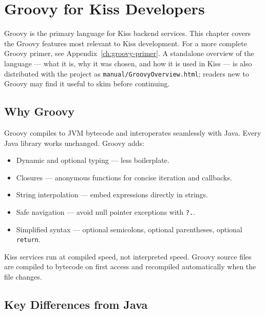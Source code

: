 \chapter{Groovy for Kiss Developers}
\label{ch:groovy}

Groovy is the primary language for Kiss backend services.  This chapter covers the Groovy features most relevant to Kiss development.  For a more complete Groovy primer, see Appendix~\ref{ch:groovy-primer}.  A standalone overview of the language --- what it is, why it was chosen, and how it is used in Kiss --- is also distributed with the project as \texttt{manual/\allowbreak{}GroovyOverview.html}; readers new to Groovy may find it useful to skim before continuing.

\section{Why Groovy}
\label{sec:groovy-why}

Groovy compiles to JVM bytecode and interoperates seamlessly with Java.  Every Java library works unchanged.  Groovy adds:

\begin{itemize}
  \item Dynamic and optional typing --- less boilerplate.
  \item Closures --- anonymous functions for concise iteration and callbacks.
  \item String interpolation --- embed expressions directly in strings.
  \item Safe navigation --- avoid null pointer exceptions with \texttt{?.}.
  \item Simplified syntax --- optional semicolons, optional parentheses, optional \texttt{return}.
\end{itemize}

\noindent
Kiss services run at compiled speed, not interpreted speed.  Groovy source files are compiled to bytecode on first access and recompiled automatically when the file changes.

\section{Key Differences from Java}
\label{sec:groovy-diffs}

